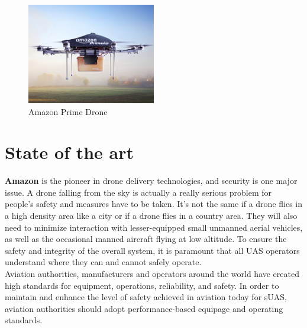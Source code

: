 \documentclass[conference]{IEEEtran}
\begin{document}

\begin{figure}[!t]
\centering
\includegraphics[width=0.5\textwidth]{Developing_Delivery_Drones_hero}
\caption{Amazon Prime Drone}
\label{fig_amazon_prime_drone}
\end{figure}

\section{State of the art}

\textbf{Amazon} is the pioneer in drone delivery technologies, and security is one major issue. A drone falling from the sky is actually a really serious problem for people's safety and measures have to be taken. It's not the same if a drone flies in a high density area like a city or if a drone flies in a country area. 
They will also need to minimize interaction with lesser-equipped small unmanned aerial vehicles, as well as the occasional manned aircraft flying at low altitude. To ensure the safety and integrity of the overall system, it is paramount that all UAS operators understand where they can and cannot safely operate.\\

Aviation authorities, manufacturers and operators around the world have created high standards for equipment, operations, reliability, and safety. In order to maintain and enhance the level of safety achieved in aviation today for sUAS, aviation authorities should adopt performance-based equipage and operating standards.\\
\end{document}
